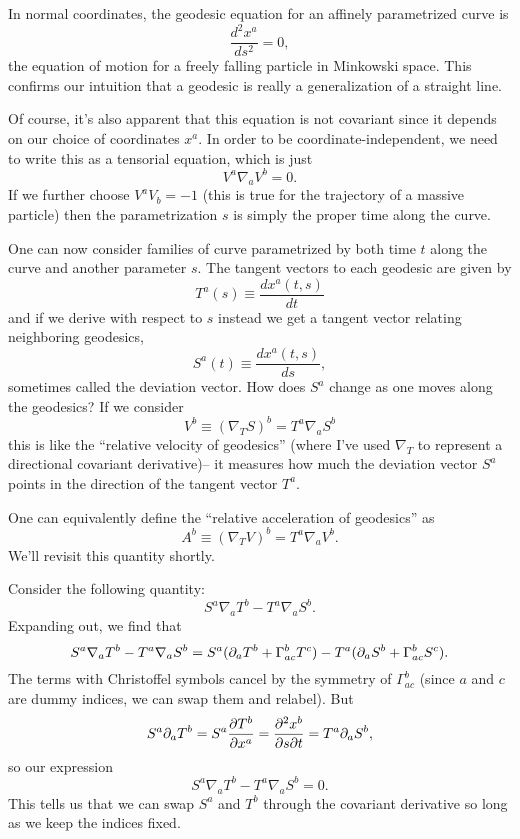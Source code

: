 In normal coordinates, the geodesic equation for an affinely parametrized curve is
$$\frac{d^2x^a}{ds^2}=0,$$
the equation of motion for a freely falling particle in Minkowski space. This confirms our intuition that a geodesic is really a generalization of a straight line.

Of course, it's also apparent that this equation is not covariant since it depends on our choice of coordinates $x^a$. In order to be coordinate-independent, we need to write this as a tensorial equation, which is just
$$V^a\nabla_a V^b=0.$$ If we further choose $V^a V_b=-1$ (this is true for the trajectory of a massive particle) then the parametrization $s$ is simply the proper time along the curve.

One can now consider families of curve parametrized by both time $t$ along the curve and another parameter $s$. The tangent vectors to each geodesic are given by
$$T^a(s) \equiv \frac{dx^a(t,s)}{dt}$$
and if we derive with respect to $s$ instead we get a tangent vector relating neighboring geodesics,
$$S^a(t)\equiv\frac{dx^a(t,s)}{ds},$$
sometimes called the deviation vector.
How does $S^a$ change as one moves along the geodesics? If we consider
$$V^b \equiv (\nabla_T S)^b=T^a\nabla_a S^b$$ this is like the ``relative velocity of geodesics'' (where I've used $\nabla_T$ to represent a directional covariant derivative)-- it measures how much the deviation vector $S^a$ points in the direction of the tangent vector $T^a$.

One can equivalently define the ``relative acceleration of geodesics'' as
$$A^b \equiv (\nabla_T V)^b = T^a \nabla_a V^b.$$ We'll revisit this quantity shortly.

\begin{lem}
Consider the following quantity:
$$S^a \nabla_a T^b-T^a \nabla_a S^b.$$ 
Expanding out, we find that $$S^a\nabla_a T^b- T^a \nabla_a S^b= S^a (\partial_a T^b +\Gamma^b_{ac} T^c) - T^a (\partial_a S^b +\Gamma^b_{ac} S^c).$$
The terms with Christoffel symbols cancel by the symmetry of $\Gamma^b_{ac}$ (since $a$ and $c$ are dummy indices, we can swap them and relabel). But $$S^a \partial_a T^b = S^a \frac{\partial T^b}{\partial x^a} = \frac{\partial^2 x^b}{\partial s\partial t} = T^a \partial_a S^b,$$
so our expression
$$S^a \nabla_a T^b-T^a \nabla_a S^b=0.$$
This tells us that we can swap $S^a$ and $T^b$ through the covariant derivative so long as we keep the indices fixed.
\end{lem}

